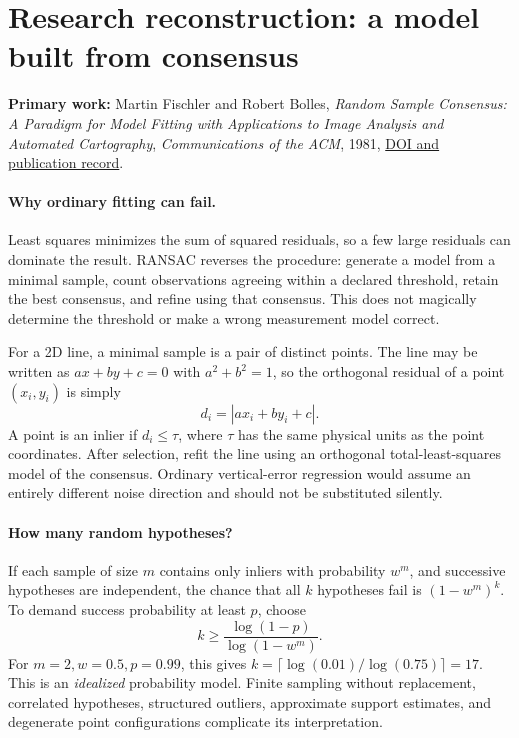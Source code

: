 \clearpage
\section*{Research reconstruction: a model built from consensus}
\noindent\textbf{Primary work:} Martin Fischler and Robert Bolles,
\emph{Random Sample Consensus: A Paradigm for Model Fitting with
Applications to Image Analysis and Automated Cartography},
\emph{Communications of the ACM}, 1981,
\href{https://doi.org/10.1145/358669.358692}{DOI and publication record}.

\paragraph{Why ordinary fitting can fail.}
Least squares minimizes the sum of squared residuals, so a few
large residuals can dominate the result. RANSAC reverses the
procedure: generate a model from a minimal sample, count
observations agreeing within a declared threshold, retain the
best consensus, and refine using that consensus.
This does not magically determine the threshold or make a
wrong measurement model correct.

For a 2D line, a minimal sample is a pair of distinct points.
The line may be written as \(ax+by+c=0\) with
\(a^2+b^2=1\), so the orthogonal residual of a point
\((x_i,y_i)\) is simply
\[
d_i=|ax_i+by_i+c|.
\]
A point is an inlier if \(d_i\le\tau\), where \(\tau\) has
the same physical units as the point coordinates. After
selection, refit the line using an orthogonal
total-least-squares model of the consensus. Ordinary
vertical-error regression would assume an entirely different
noise direction and should not be substituted silently.

\paragraph{How many random hypotheses?}
If each sample of size \(m\) contains only inliers with
probability \(w^m\), and successive hypotheses are
independent, the chance that all \(k\) hypotheses fail is
\((1-w^m)^k\). To demand success probability at least \(p\),
choose
\[
k\ge\frac{\log(1-p)}{\log(1-w^m)}.
\]
For \(m=2,w=0.5,p=0.99\), this gives
\(k=\lceil\log(0.01)/\log(0.75)\rceil=17\).
This is an \emph{idealized} probability model. Finite
sampling without replacement, correlated hypotheses,
structured outliers, approximate support estimates, and
degenerate point configurations complicate its interpretation.

